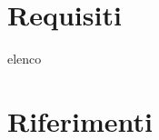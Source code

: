 \documentclass[a4paper, 12pt]{article}
\begin{document}


\section{Requisiti}
elenco

\section{Riferimenti}
\end{document}
